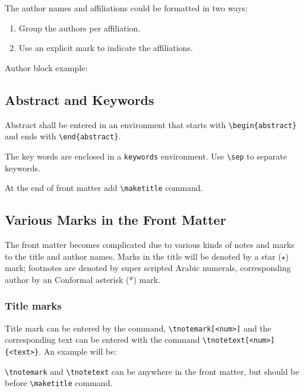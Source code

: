 \documentclass[
]{ceurart}
\begin{document}
The author names and affiliations could be formatted in two ways:
\begin{enumerate}
\item Group the authors per affiliation.
\item Use an explicit mark to indicate the affiliations.
\end{enumerate}

Author block example:


\subsection{Abstract and Keywords}

Abstract shall be entered in an environment that starts
with \verb|\begin{abstract}| and ends with
\verb|\end{abstract}|. 



The key words are enclosed in a \verb|keywords|
environment. Use \verb|\sep| to separate keywords.



At the end of front matter add \verb|\maketitle| command.

\subsection{Various Marks in the Front Matter}

The front matter becomes complicated due to various kinds
of notes and marks to the title and author names. Marks in
the title will be denoted by a star ($\star$) mark;
footnotes are denoted by super scripted Arabic numerals,
corresponding author by an Conformal asterisk (*) mark.

\subsubsection{Title marks}

Title mark can be entered by the command, \verb|\tnotemark[<num>]|
and the corresponding text can be entered with the command
\verb|\tnotetext[<num>]{<text>}|. An example will be:



\verb|\tnotemark| and \verb|\tnotetext| can be anywhere in
the front matter, but should be before \verb|\maketitle| command.
\end{document}
